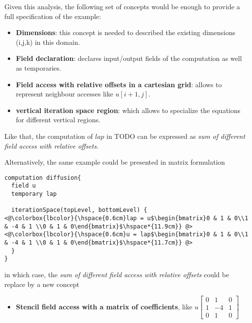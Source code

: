 \documentclass[a4paper,10pt]{scrartcl}
\begin{document}
Given this analysis, the following set of concepts would be enough to provide a full specification of the example: 

\begin{itemize}
	\item \textbf{Dimensions}: this concept is needed to described the existing dimensions (i,j,k) in this domain.
	\item \textbf{Field declaration}: declares input/output fields of the computation as well as temporaries.
	\item \textbf{Field access with relative offsets in a cartesian grid}: allows to represent neighbour accesses like $u[i+1,j]$.
	\item \textbf{vertical iteration space region}: which allows to specialize the equations for different vertical regions.
\end{itemize} 
Like that, the computation of $lap$ in TODO can be expressed as \textit{sum of different field access with relative offsets}.

Alternatively, the same example could be presented in matrix formulation

\begin{lstlisting}
computation diffusion{
  field u
  temporary lap
  
  iterationSpace(topLevel, bottomLevel) {
<@\colorbox{lbcolor}{\hspace{0.6cm}lap = u$\begin{bmatrix}0 & 1 & 0\\1 & -4 & 1 \\0 & 1 & 0\end{bmatrix}$\hspace*{11.9cm}} @>
<@\colorbox{lbcolor}{\hspace{0.6cm}u = lap$\begin{bmatrix}0 & 1 & 0\\1 & -4 & 1 \\0 & 1 & 0\end{bmatrix}$\hspace*{11.7cm}} @>
  }
}
\end{lstlisting}

in which case, the \textit{sum of different field access with relative offsets} could be replace by a new concept
\begin{itemize}
	\item \textbf{Stencil field access with a matrix of coefficients}, like $u\begin{bmatrix}0 & 1 & 0\\1 & -4 & 1 \\0 & 1 & 0\end{bmatrix}$
\end{itemize}
\end{document}
